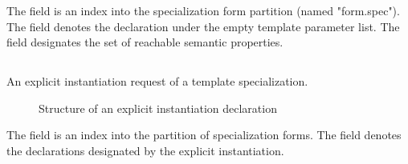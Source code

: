 The  field is an index into the specialization form partition (named "form.spec").
The  field denotes the declaration under the empty template parameter list.
The  field designates the set of reachable semantic properties.



\subsection{} 
\label{sec:ifc:DeclSort:ExplicitInstantiation}

An explicit instantiation
request of a template specialization. 
%
\begin{figure}[H]
	\centering
	\caption{Structure of an explicit instantiation declaration}
	\label{fig:ifc-explicit-instantiation-declaration}
\end{figure}
%

The  field is an index into the partition of specialization forms.
The  field denotes the declarations designated by the explicit instantiation.


\subsection{}
\label{sec:ifc:DeclSort:Concept}

